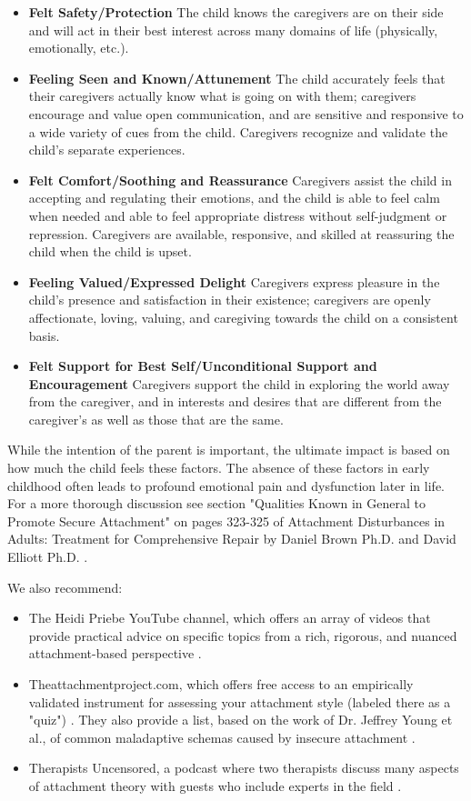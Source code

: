 \documentclass[12pt,letterpaper]{book}
\begin{document}
\begin{itemize}
    \item \textbf{Felt Safety/Protection} The child knows the caregivers are on their side and will act in their best interest across many domains of life (physically, emotionally, etc.).
    \item \textbf{Feeling Seen and Known/Attunement} The child accurately feels that their caregivers actually know what is going on with them; caregivers encourage and value open communication, and are sensitive and responsive to a wide variety of cues from the child. Caregivers recognize and validate the child's separate experiences.
    \item \textbf{Felt Comfort/Soothing and Reassurance} Caregivers assist the child in accepting and regulating their emotions, and the child is able to feel calm when needed and able to feel appropriate distress without self-judgment or repression. Caregivers are available, responsive, and skilled at reassuring the child when the child is upset.
    \item \textbf{Feeling Valued/Expressed Delight} Caregivers express pleasure in the child's presence and satisfaction in their existence; caregivers are openly affectionate, loving, valuing, and caregiving towards the child on a consistent basis.
    \item \textbf{Felt Support for Best Self/Unconditional Support and Encouragement} Caregivers support the child in exploring the world away from the caregiver, and in interests and desires that are different from the caregiver's as well as those that are the same.
\end{itemize}

While the intention of the parent is important, the ultimate impact is based on how much the child feels these factors. The absence of these factors in early childhood often leads to profound emotional pain and dysfunction later in life. For a more thorough discussion see section "Qualities Known in General to Promote Secure Attachment" on pages 323-325 of Attachment Disturbances in Adults: Treatment for Comprehensive Repair by Daniel Brown Ph.D. and David Elliott Ph.D. \cite{brownAttachmentDisturbances}.

We also recommend:
\begin{itemize}
    \item The Heidi Priebe YouTube channel, which offers an array of videos that provide practical advice on specific topics from a rich, rigorous, and nuanced attachment-based perspective \cite{priebeYoutube}.
    \item Theattachmentproject.com, which offers free access to an empirically validated instrument for assessing your attachment style (labeled there as a "quiz") \cite{attachmentProject}. They also provide a list, based on the work of Dr. Jeffrey Young et al., of common maladaptive schemas caused by insecure attachment \cite{earlyMalSchemas}.
    \item Therapists Uncensored, a podcast where two therapists discuss many aspects of attachment theory with guests who include experts in the field \cite{therapistsUncensored}.
\end{itemize}
\end{document}
